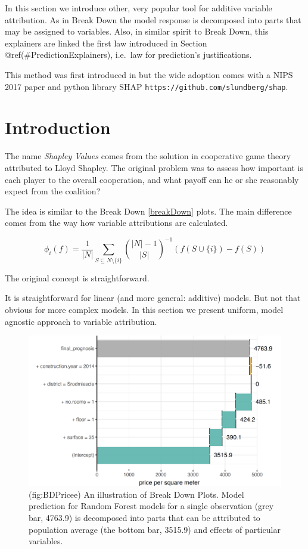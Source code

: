 \documentclass[]{book}
\theoremstyle{definition}
\theoremstyle{definition}
\theoremstyle{definition}
\theoremstyle{remark}
\begin{document}
In this section we introduce other, very popular tool for additive
variable attribution. As in Break Down the model response is decomposed
into parts that may be assigned to variables. Also, in similar spirit to
Break Down, this explainers are linked the first law introduced in
Section @ref(\#PredictionExplainers), i.e.~law for prediction's
justifications.

This method was first introduced in \citep{Strumbelj2014} but the wide
adoption comes with a NIPS 2017 paper \citep{SHAP} and python library
SHAP \texttt{https://github.com/slundberg/shap}.

\hypertarget{introduction-1}{%
\section{Introduction}\label{introduction-1}}

The name \emph{Shapley Values} comes from the solution in cooperative
game theory attributed to Lloyd Shapley. The original problem was to
assess how important is each player to the overall cooperation, and what
payoff can he or she reasonably expect from the coalition?
\citep{shapleybook1952}

The idea is similar to the Break Down \ref{breakDown} plots. The main
difference comes from the way how variable attributions are calculated.

\[
\phi_i (f) = \frac 1{|N|}\sum_{S \subseteq N\setminus \{i\}}  {{|N|-1}\choose{|S|}}^{-1} \left(f(S \cup \{i\}) - f(S)\right)
\]

The original concept is straightforward.

\citep{TreeSHAP}

It is straightforward for linear (and more general: additive) models.
But not that obvious for more complex models. In this section we present
uniform, model agnostic approach to variable attribution.

\begin{figure}

{\centering \includegraphics[width=0.7\linewidth]{figure/bd_price_1} 

}

\caption{(fig:BDPricee) An illustration of Break Down Plots. Model prediction for Random Forest models for a single observation (grey bar, 4763.9) is decomposed into parts that can be attributed to population average (the bottom bar, 3515.9) and effects of particular variables. }\label{fig:BDPricee}
\end{figure}
\end{document}

